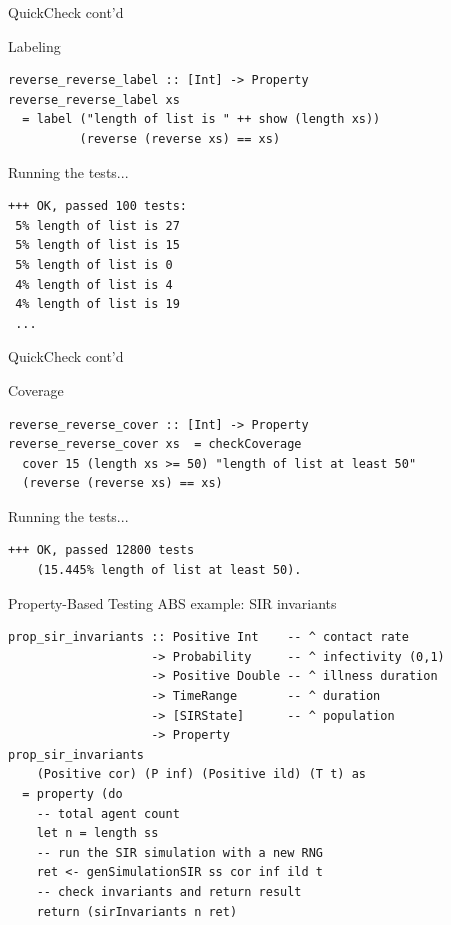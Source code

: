 \documentclass{beamer} %
\begin{document}
\begin{frame}[fragile]{QuickCheck cont'd}
\begin{block}{Labeling}
\begin{verbatim}
reverse_reverse_label :: [Int] -> Property
reverse_reverse_label xs  
  = label ("length of list is " ++ show (length xs)) 
          (reverse (reverse xs) == xs)
\end{verbatim}
\end{block}

\begin{block}{Running the tests...}
\begin{footnotesize}
\begin{verbatim}
+++ OK, passed 100 tests:
 5% length of list is 27
 5% length of list is 15
 5% length of list is 0
 4% length of list is 4
 4% length of list is 19
 ...
\end{verbatim}
\end{footnotesize}
\end{block}
\end{frame}

\begin{frame}[fragile]{QuickCheck cont'd}
\begin{block}{Coverage}
\begin{verbatim}
reverse_reverse_cover :: [Int] -> Property
reverse_reverse_cover xs  = checkCoverage 
  cover 15 (length xs >= 50) "length of list at least 50"
  (reverse (reverse xs) == xs)
\end{verbatim}
\end{block}

\begin{block}{Running the tests...}
\begin{footnotesize}
\begin{verbatim}
+++ OK, passed 12800 tests 
    (15.445% length of list at least 50).
\end{verbatim}
\end{footnotesize}
\end{block}
\end{frame}

\begin{frame}[fragile]{Property-Based Testing ABS example: SIR invariants}
\begin{verbatim}
prop_sir_invariants :: Positive Int    -- ^ contact rate
                    -> Probability     -- ^ infectivity (0,1)
                    -> Positive Double -- ^ illness duration
                    -> TimeRange       -- ^ duration
                    -> [SIRState]      -- ^ population
                    -> Property
prop_sir_invariants 
    (Positive cor) (P inf) (Positive ild) (T t) as  
  = property (do
    -- total agent count
    let n = length ss
    -- run the SIR simulation with a new RNG 
    ret <- genSimulationSIR ss cor inf ild t
    -- check invariants and return result
    return (sirInvariants n ret)
\end{verbatim}
\end{frame}
\end{document}

